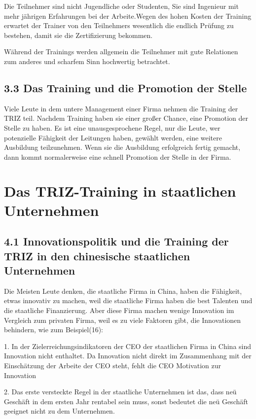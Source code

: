 \documentclass[11pt,a4paper]{article}
\begin{document}
Die Teilnehmer sind nicht Jugendliche oder Studenten, Sie sind Ingenieur mit
mehr jährigen Erfahrungen bei der Arbeite.Wegen des hohen Kosten der Training
erwartet der Trainer von den Teilnehmers wesentlich die endlich Prüfung zu
bestehen, damit sie die Zertifizierung bekommen.

Während der Trainings werden allgemein die Teilnehmer mit gute Relationen zum
anderes und scharfem Sinn  hochwertig betrachtet.


\subsection{3.3 Das Training und die Promotion der Stelle}

Viele Leute in dem untere Management einer Firma nehmen die Training der TRIZ
teil. Nachdem Training haben sie einer großer Chance, eine Promotion der
Stelle zu haben. Es ist eine unausgesprochene Regel, nur die Leute, wer
potenzielle Fähigkeit der Leitungen haben, gewählt werden, eine weitere
Ausbildung  teilzunehmen. Wenn sie die Ausbildung erfolgreich fertig gemacht,
dann kommt normalerweise eine schnell Promotion der Stelle in der Firma.  

\section{Das TRIZ-Training in staatlichen Unternehmen}

\subsection{4.1 Innovationspolitik und die Training der TRIZ in den chinesische
staatlichen Unternehmen}

Die Meisten Leute denken, die staatliche Firma in China, haben die Fähigkeit,
etwas innovativ zu machen, weil die staatliche Firma haben die best Talenten
und die staatliche Finanzierung. Aber diese Firma machen wenige Innovation im
Vergleich zum privaten Firma, weil es zu viele Faktoren gibt, die Innovationen
behindern, wie zum Beispiel(16):

1. In der Zielerreichungsindikatoren der CEO der staatlichen Firma in China
sind Innovation nicht enthaltet. Da Innovation nicht direkt im Zusammenhang
mit der Einschätzung der Arbeite der CEO steht, fehlt die CEO Motivation zur
Innovation

2. Das erste versteckte Regel in der staatliche Unternehmen ist  das, dass
neü Geschäft  in dem ersten Jahr rentabel sein muss, sonst bedeutet die neü
Geschäft geeignet nicht zu dem Unternehmen.
\end{document}
